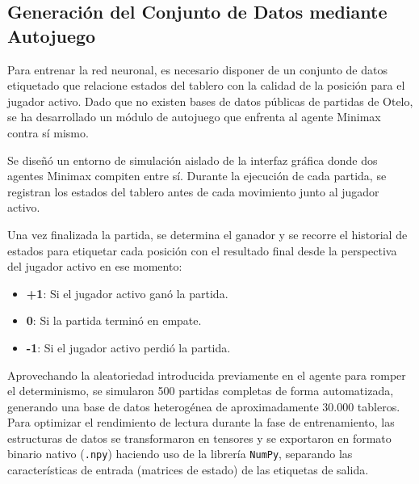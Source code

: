 \documentclass[conference]{IEEEtran}
\begin{document}
\subsection{Generación del Conjunto de Datos mediante Autojuego}
Para entrenar la red neuronal, es necesario disponer de un conjunto de datos etiquetado que relacione estados del tablero con la calidad de la posición para el jugador activo. 
Dado que no existen bases de datos públicas de partidas de Otelo, se ha desarrollado un módulo de autojuego que enfrenta al agente Minimax contra sí mismo.

Se diseñó un entorno de simulación aislado de la interfaz gráfica donde dos agentes Minimax compiten entre sí. Durante la ejecución de cada partida, se registran los estados del 
tablero antes de cada movimiento junto al jugador activo.

Una vez finalizada la partida, se determina el ganador y se recorre el historial de estados para etiquetar cada posición con el resultado final desde la perspectiva del jugador activo en ese momento:
\begin{itemize}
    \item \textbf{+1}: Si el jugador activo ganó la partida.
    \item \textbf{0}: Si la partida terminó en empate.
    \item \textbf{-1}: Si el jugador activo perdió la partida.
\end{itemize}

Aprovechando la aleatoriedad introducida previamente en el agente para romper el determinismo, se simularon 500 partidas completas de forma automatizada, generando una base de 
datos heterogénea de aproximadamente 30.000 tableros. Para optimizar el rendimiento de lectura durante la fase de entrenamiento, las estructuras de datos se transformaron 
en tensores y se exportaron en formato binario nativo (\texttt{.npy}) haciendo uso de la librería \texttt{NumPy}, separando las características 
de entrada (matrices de estado) de las etiquetas de salida.
\end{document}
